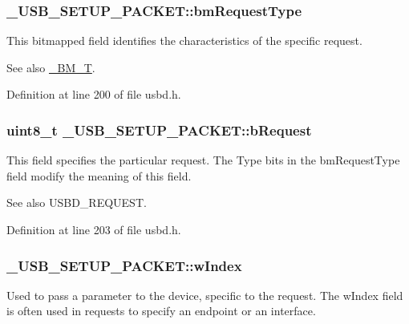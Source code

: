 \subsubsection[{\texorpdfstring{bm\+Request\+Type}{bmRequestType}}]{ \+\_\+\+U\+S\+B\+\_\+\+S\+E\+T\+U\+P\+\_\+\+P\+A\+C\+K\+E\+T\+::bm\+Request\+Type}\hypertarget{struct__USB__SETUP__PACKET_ac3379b5aabd08a8d980fe8d030f5d6a8}{}\label{struct__USB__SETUP__PACKET_ac3379b5aabd08a8d980fe8d030f5d6a8}
This bitmapped field identifies the characteristics of the specific request. \begin{DoxySeeAlso}{See also}
\hyperlink{struct__BM__T}{\+\_\+\+B\+M\+\_\+T}. 
\end{DoxySeeAlso}


Definition at line 200 of file usbd.\+h.

\subsubsection[{\texorpdfstring{b\+Request}{bRequest}}]{\setlength{\rightskip}{0pt plus 5cm}uint8\+\_\+t \+\_\+\+U\+S\+B\+\_\+\+S\+E\+T\+U\+P\+\_\+\+P\+A\+C\+K\+E\+T\+::b\+Request}\hypertarget{struct__USB__SETUP__PACKET_a95f462f8491a38e7ee662dcd95d5cb6a}{}\label{struct__USB__SETUP__PACKET_a95f462f8491a38e7ee662dcd95d5cb6a}
This field specifies the particular request. The Type bits in the bm\+Request\+Type field modify the meaning of this field. \begin{DoxySeeAlso}{See also}
U\+S\+B\+D\+\_\+\+R\+E\+Q\+U\+E\+ST. 
\end{DoxySeeAlso}


Definition at line 203 of file usbd.\+h.

\subsubsection[{\texorpdfstring{w\+Index}{wIndex}}]{ \+\_\+\+U\+S\+B\+\_\+\+S\+E\+T\+U\+P\+\_\+\+P\+A\+C\+K\+E\+T\+::w\+Index}\hypertarget{struct__USB__SETUP__PACKET_a1f0ec0c931efe4a96d92b3ceea80b2a3}{}\label{struct__USB__SETUP__PACKET_a1f0ec0c931efe4a96d92b3ceea80b2a3}
Used to pass a parameter to the device, specific to the request. The w\+Index field is often used in requests to specify an endpoint or an interface. 

